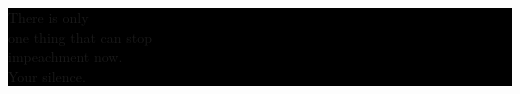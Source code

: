 \documentclass{article}
\renewcommand{\baselinestretch}{1} %
\begin{document}
\newcommand{\pt}{\hskip 1pt}
\newcommand{\lb}{\linebreak}


\begin{center}
\colorbox{black}{

\setmainfont{Arial Black}
\renewcommand{\baselinestretch}{.8} %

\begin{minipage}{.98\textwidth}
\color{white}
\fontsize{50}{60}\selectfont
\vspace{50pt}
\begin{center}
There is only\\
one thing that can stop\\
impeachment now.\\
\vspace{10pt}
Your silence.
\vspace{50pt}
\end{center}
\end{minipage}
}
\end{center}

\renewcommand{\baselinestretch}{1}

\color{black}

\setmainfont{Arial}

\parskip 0pt %
\end{document}
